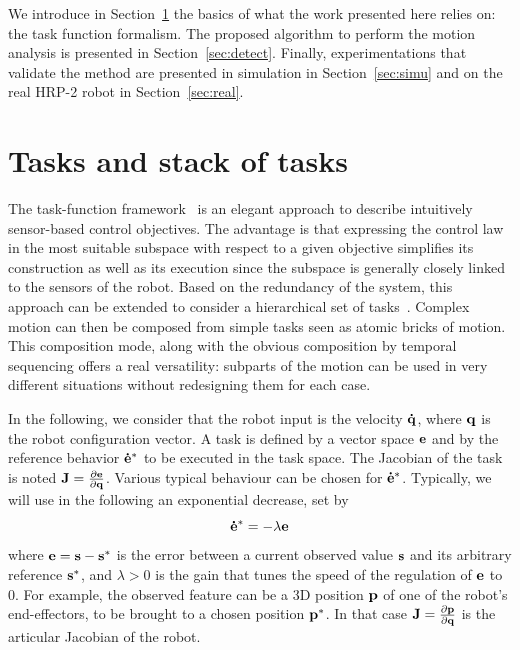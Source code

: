 \documentclass[journal]{IEEEtran}
\begin{document}
We introduce in Section~\ref{sec:sot} the basics of what the work presented here
relies on: the task function formalism. The proposed algorithm to perform the 
motion analysis is presented in Section~\ref{sec:detect}.
Finally, experimentations that validate the method are presented in 
simulation in Section~\ref{sec:simu} and on the real HRP-2 robot in Section~\ref{sec:real}.

\section{Tasks and stack of tasks}
\label{sec:sot}
The task-function framework~\cite{samson91} is an elegant approach to describe intuitively
sensor-based control objectives. The advantage is that expressing the control law
in the most suitable subspace with respect to a given objective simplifies its construction
as well as its execution since the subspace is generally closely linked to the sensors of
the robot. Based on the redundancy of the system, this
approach can be extended to consider a hierarchical set of
tasks~\cite{siciliano91}. Complex motion can then be composed from simple tasks seen as atomic bricks
of motion. This composition mode, along with the obvious composition by temporal
sequencing offers a real versatility: subparts of the motion can be used in
very different situations without redesigning them for each case.

In the following, we consider that the robot input is the velocity ${\mathbf{\dot{q}}}$,
where ${\mathbf{q}}$ is the robot configuration vector.                   
A task is defined by a vector space 
${\mathbf{e}}$ and by the reference behavior ${\mathbf{\dot{e}^*}}$ to be
executed in the task space.  
The Jacobian of the task is noted
${\mathbf{J}}=\frac{\partial{{\mathbf{e}}}}{\partial{{\mathbf{q}}}}$. 
Various typical behaviour can be chosen for ${\mathbf{\dot{e}^*}}$. Typically, we will
use in the following an exponential decrease, set by
\begin{equation}
  \mbf{\dot{e}^*} = -\lambda\mbf{e}
  \label{eq:lambda}
\end{equation}
where ${\mathbf{e}} = {\mathbf{s}} - {\mathbf{s^*}}$ is the error between a current
observed value ${\mathbf{s}}$ and its arbitrary reference ${\mathbf{s^*}}$,
and $\lambda>0$ is the gain that tunes the speed of the regulation of ${\mathbf{e}}$ to $0$.
For example, the observed feature can be a 3D position ${\mathbf{p}}$ of one of
the robot's end-effectors, to be brought to a chosen position ${\mathbf{p^*}}$.
In that case ${\mathbf{J}} = \frac{\partial{{\mathbf{p}}}}{\partial{{\mathbf{q}}}}$ is the articular Jacobian of the robot.
\end{document}
